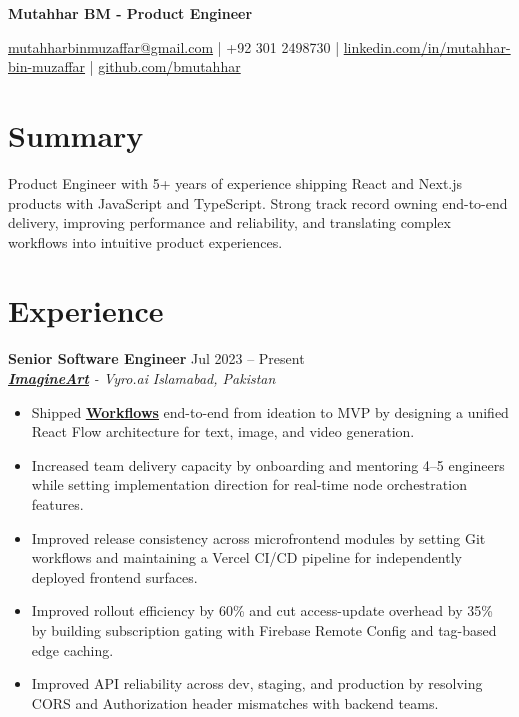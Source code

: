 \documentclass[9pt,letterpaper]{article}
\newcommand{\resumeHeader}[1]{%
  \begin{center}
    \vspace{0pt}
    {\fontsize{18pt}{20pt}\selectfont\bfseries #1\par}
    \vspace{0pt}
  \end{center}
}
\newcommand{\role}[4]{\textbf{#1} \hfill #2 \\
\textit{#3} \hfill \textit{#4}\\[-5pt]}
\begin{document}
\resumeHeader{Mutahhar BM - Product Engineer}
\begin{center}
\fontsize{9pt}{10pt}\selectfont
\href{mailto:mutahharbinmuzaffar@gmail.com}{mutahharbinmuzaffar@gmail.com} \;|\; +92 301 2498730 \;|\;
\href{https://www.linkedin.com/in/mutahhar-bin-muzaffar}{linkedin.com/in/mutahhar-bin-muzaffar} \;|\;
\href{https://github.com/bmutahhar}{github.com/bmutahhar}
\end{center}

\section*{Summary}
Product Engineer with 5+ years of experience shipping React and Next.js products with JavaScript and TypeScript. Strong track record owning end-to-end delivery, improving performance and reliability, and translating complex workflows into intuitive product experiences.

\section*{Experience}
\role{Senior Software Engineer}{Jul 2023 -- Present}{\href{https://www.imagine.art/}{\textbf{\underline{ImagineArt}}} - Vyro.ai}{Islamabad, Pakistan}
\begin{itemize}[leftmargin=*, itemsep=0pt, topsep=0pt, partopsep=0pt, parsep=0pt, after=\vspace{1pt}]
  \item Shipped \href{https://www.imagine.art/flow}{\textbf{\underline{Workflows}}} end-to-end from ideation to MVP by designing a unified React Flow architecture for text, image, and video generation.
  \item Increased team delivery capacity by onboarding and mentoring 4--5 engineers while setting implementation direction for real-time node orchestration features.
  \item Improved release consistency across microfrontend modules by setting Git workflows and maintaining a Vercel CI/CD pipeline for independently deployed frontend surfaces.
  \item Improved rollout efficiency by 60\% and cut access-update overhead by 35\% by building subscription gating with Firebase Remote Config and tag-based edge caching.
  \item Improved API reliability across dev, staging, and production by resolving CORS and Authorization header mismatches with backend teams.
\end{itemize}
\end{document}
